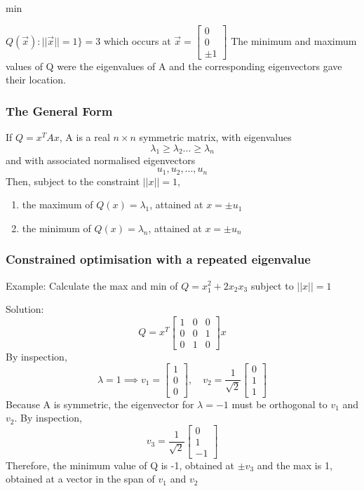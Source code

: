 \documentclass[12pt]{article} %
\begin{document}
min{$Q(\vec{x}) : ||\vec{x}|| = 1\} = 3$ which occurs at $\vec{x} = \begin{bmatrix}
	0\\
	0\\
	\pm 1
\end{bmatrix}$
The minimum and maximum values of Q were the eigenvalues of A and the corresponding eigenvectors gave their location. 

\subsubsection{The General Form}
If $Q = x^T A x$, A is a real $n \times n$ symmetric matrix, with eigenvalues 
$$\lambda_1 \geq \lambda_2 ... \geq \lambda_n$$
and with associated normalised eigenvectors
$$u_1, u_2, ..., u_n$$
Then, subject to the constraint $||x|| = 1$, 
\begin{enumerate}
	\item the maximum of $Q(x) = \lambda_1$, attained at $x = \pm u_1$
	\item the minimum of $Q(x) = \lambda_n$, attained at $x = \pm u_n$
\end{enumerate}

\subsubsection{Constrained optimisation with a repeated eigenvalue}
Example: Calculate the max and min of 
$Q = x_1^2 + 2x_2 x_3$ subject to $||x|| = 1$

Solution:
$$Q = x^T \begin{bmatrix}
		1 & 0 & 0\\
		0 & 0 & 1\\
		0 & 1 & 0
	\end{bmatrix} x$$
By inspection, 
$$\lambda = 1 \implies v_1 = \begin{bmatrix}
	1 \\0\\0
\end{bmatrix}, \quad v_2 = \frac{1}{\sqrt{2}}\begin{bmatrix}
	0\\1\\1
\end{bmatrix}$$
Because A is symmetric, the eigenvector for $\lambda = -1$ must be orthogonal to $v_1$ and $v_2$. By inspection,
$$v_3 = \frac{1}{\sqrt{2}} \begin{bmatrix}
	0\\1\\-1
\end{bmatrix}$$
Therefore, the minimum value of Q is -1, obtained at $\pm v_3$ and the max is 1, obtained at a vector in the span of $v_1$ and $v_2$

}
\end{document}
